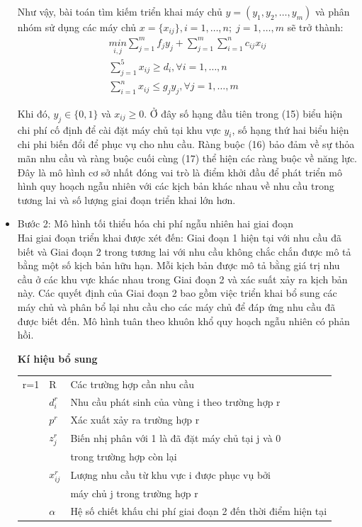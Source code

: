 \documentclass[a4paper]{article}
\begin{document}
\begin{itemize}
        Như vậy, bài toán tìm kiếm triển khai máy chủ $y = (y_1,y_2, \dotsc, y_m)$ và phân nhóm sử dụng các máy chủ
        $x=\{x_{ij}\}, i = 1, \dotsc, n; \; j = 1, \dotsc, m$ sẽ trở thành:
        \begin{gather}
            \underset{i,j}{min} \sum_{j=1}^{m} f_j y_j + \sum_{j=1}^{m}\sum_{i=1}^{n}c_{ij}x_{ij}\\
            \sum_{j=1}^{5}x_{ij} \geq d_i, \forall i = 1, \dotsc, n\\
            \sum_{i=1}^{n}x_{ij} \leq g_jy_j, \forall j = 1, \dotsc, m
        \end{gather}

        Khi đó, $y_j \in \{0,1\}$ và $x_{ij} \geq 0$. Ở đây số hạng đầu tiên trong (15) biểu hiện chi phí cố định để cài đặt 
        máy chủ tại khu vực $y_i$, số hạng thứ hai biểu hiện chi phi biến đổi để phục vụ cho nhu cầu. 
        Ràng buộc (16) bảo đảm về sự thỏa mãn nhu cầu và ràng buộc cuối cùng (17) thể hiện các ràng buộc về năng lực. 
        Đây là mô hình cơ sở nhất đóng vai trò là điểm khởi đầu để phát triển mô hình quy hoạch ngẫu nhiên với các kịch bản khác nhau 
        về nhu cầu trong tương lai và số lượng giai đoạn triển khai lớn hơn.

        \item Bước 2: Mô hình tối thiểu hóa chi phí ngẫu nhiên hai giai đoạn\\
        Hai giai đoạn triển khai được xét đến: Giai đoạn 1 hiện tại với nhu cầu đã biết và 
        Giai đoạn 2 trong tương lai với nhu cầu không chắc chắn được mô tả bằng một số kịch bản hữu hạn. 
        Mỗi kịch bản được mô tả bằng giá trị nhu cầu ở các khu vực khác nhau trong Giai đoạn 2 
        và xác suất xảy ra kịch bản này. Các quyết định của Giai đoạn 2 bao gồm việc triển khai bổ sung các máy chủ và 
        phân bổ lại nhu cầu cho các máy chủ để đáp ứng nhu cầu đã được biết đến. Mô hình tuân theo khuôn khổ quy hoạch ngẫu nhiên có phản hồi.

        \textbf{Kí hiệu bổ sung}

        \begin{tabular}{lll}
            \toprule
            r=1 & R & Các trường hợp cần nhu cầu\\
            & $d_i^r$ & Nhu cầu phát sinh của vùng i theo trường hợp r\\
            & $p^r$ & Xác xuất xảy ra trường hợp r\\
            & $z_j^r$ & Biến nhị phân với 1 là đã đặt máy chủ tại j và 0\\
            &&trong trường hợp còn lại\\
            & $x_{ij}^r$ & Lượng nhu cầu từ khu vực i được phục vụ bởi\\
            &&máy chủ j trong trường hợp r\\
            &$\alpha$& Hệ số chiết khấu chi phí giai đoạn 2 đến thời điểm hiện tại\\
            \bottomrule
        \end{tabular}\\


\end{itemize}
\end{document}
